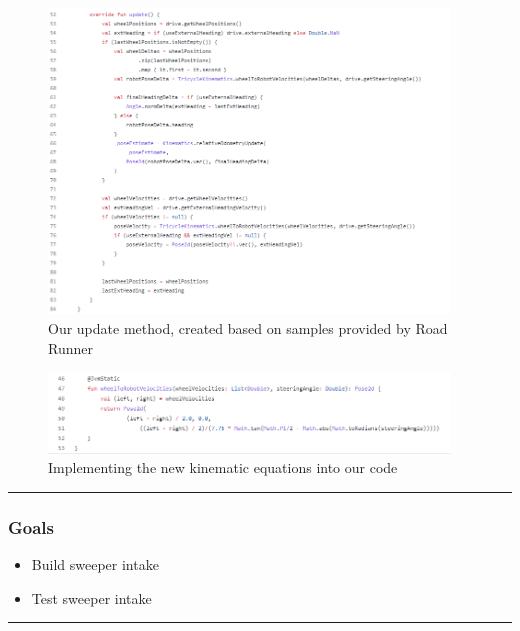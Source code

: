 \begin{figure}[htp]
\centering
\includegraphics[width=0.95\textwidth, angle=0]{Meetings/January/01-11-22/1.13.22 tricyledrive.kt - James Hu.PNG}
\caption{Our update method, created based on samples provided by Road Runner}
\label{fig:011122_1}
\end{figure}

\begin{figure}[htp]
\centering
\includegraphics[width=0.95\textwidth, angle=0]{Meetings/January/01-11-22/1.13.22 tricyledrivekinematics.kt - James Hu.PNG}
\caption{Implementing the new kinematic equations into our code}
\label{fig:011122_2}
\end{figure}


\noindent\hfil\rule{\textwidth}{.4pt}\hfil
\subsubsection*{Goals}
\begin{itemize}
    \item Build sweeper intake 
	\item Test sweeper intake
  

\end{itemize} 

\noindent\hfil\rule{\textwidth}{.4pt}\hfil

